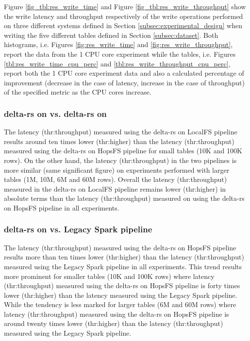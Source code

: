 Figure \ref{fig_tbl:res_write_time} and Figure \ref{fig_tbl:res_write_throughput} show the write latency and throughput respectively of the write operations performed on three different systems defined in Section \ref{subsec:experimental_design} when writing the five different tables defined in Section \ref{subsec:dataset}. Both histograms, i.e. Figures \ref{fig:res_write_time} and \ref{fig:res_write_throughput}, report the data from the 1 \gls{CPU} core experiment while the tables, i.e. Figures \ref{tbl:res_write_time_cpu_perc} and \ref{tbl:res_write_throughput_cpu_perc}, report both the 1 \gls{CPU} core experiment data and also a calculated percentage of improvement (decrease in the case of latency, increase in the case of throughput) of the specified metric as the \gls{CPU} cores increase.

\subsubsection*{delta-rs on  vs. delta-rs on }

The latency (thr:throughput) measured using the delta-rs on \gls{LocalFS} pipeline results around ten times lower (thr:higher) than the latency (thr:throughput) measured using the delta-rs on \gls{HopsFS} pipeline for small tables (10K and 100K rows). On the other hand, the latency (thr:throughput) in the two pipelines is more similar (same significant figure) on experiments performed with larger tables (1M, 10M, 6M and 60M rows). Overall the latency (thr:throughput) measured in the delta-rs on \gls{LocalFS} pipeline remains lower (thr:higher) in absolute terms than the latency (thr:throughput) measured on using the delta-rs on \gls{HopsFS} pipeline in all experiments.

\subsubsection*{delta-rs on  vs. Legacy Spark pipeline}

The latency (thr:throughput) measured using the delta-rs on \gls{HopsFS} pipeline results more than ten times lower (thr:higher) than the latency (thr:throughput) measured using the Legacy Spark pipeline in all experiments. This trend results more prominent for smaller tables (10K and 100K rows) where latency (thr:throughput) measured using the delta-rs on \gls{HopsFS} pipeline is forty times lower (thr:higher) than the latency measured using the Legacy Spark pipeline. While the tendency is less marked for larger tables (6M and 60M rows) where latency (thr:throughput) measured using the delta-rs on \gls{HopsFS} pipeline is around twenty times lower (thr:higher) than the latency (thr:throughput) measured using the Legacy Spark pipeline.

